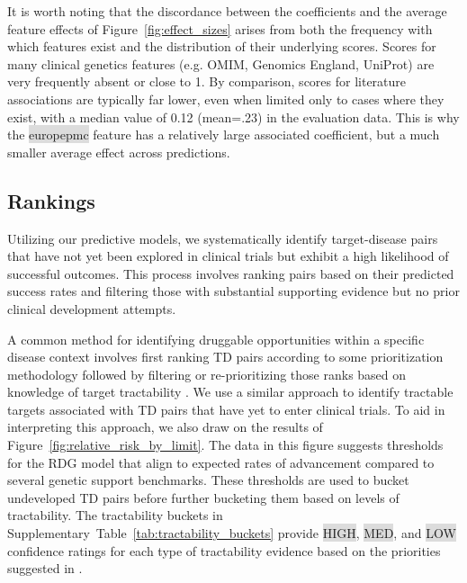 \documentclass{article}
\begin{document}
It is worth noting that the discordance between the coefficients and the average feature effects of Figure~\ref{fig:effect_sizes} arises from both the frequency with which features exist and the distribution of their underlying scores. Scores for many clinical genetics features (e.g. OMIM, Genomics England, UniProt) are very frequently absent or close to 1. By comparison, scores for literature associations are typically far lower, even when limited only to cases where they exist, with a median value of 0.12 (mean=.23) in the evaluation data. This is why the \colorbox{Gainsboro}{europepmc} feature has a relatively large associated coefficient, but a much smaller average effect across predictions.


\subsection{Rankings}
\label{sec:results_rankings}

Utilizing our predictive models, we systematically identify target-disease pairs that have not yet been explored in clinical trials but exhibit a high likelihood of successful outcomes. This process involves ranking pairs based on their predicted success rates and filtering those with substantial supporting evidence but no prior clinical development attempts.

A common method for identifying druggable opportunities within a specific disease context involves first ranking TD pairs according to some prioritization methodology followed by filtering or re-prioritizing those ranks based on knowledge of target tractability \cite{PMID:28356508,PMID:35401535,PMID:31253980}. We use a similar approach to identify tractable targets associated with TD pairs that have yet to enter clinical trials. To aid in interpreting this approach, we also draw on the results of Figure~\ref{fig:relative_risk_by_limit}. The data in this figure suggests thresholds for the RDG model that align to expected rates of advancement compared to several genetic support benchmarks. These thresholds are used to bucket undeveloped TD pairs before further bucketing them based on levels of tractability. The tractability buckets in Supplementary~Table~\ref{tab:tractability_buckets} provide \colorbox{Gainsboro}{HIGH}, \colorbox{Gainsboro}{MED}, and \colorbox{Gainsboro}{LOW} confidence ratings for each type of tractability evidence based on the priorities suggested in \cite{OTTractability}.
\end{document}
